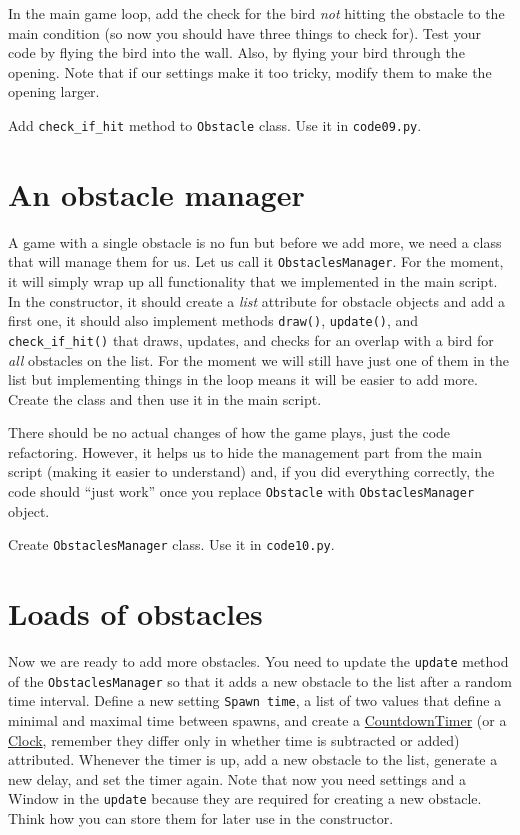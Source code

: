 \documentclass[
]{book}
\begin{document}
In the main game loop, add the check for the bird \emph{not} hitting the obstacle to the main condition (so now you should have three things to check for).
Test your code by flying the bird into the wall. Also, by flying your bird through the opening. Note that if our settings make it too tricky, modify them to make the opening larger.

Add \texttt{check\_if\_hit} method to \texttt{Obstacle} class.
Use it in \texttt{code09.py}.

\hypertarget{an-obstacle-manager}{%
\section{An obstacle manager}\label{an-obstacle-manager}}

A game with a single obstacle is no fun but before we add more, we need a class that will manage them for us. Let us call it \texttt{ObstaclesManager}. For the moment, it will simply wrap up all functionality that we implemented in the main script. In the constructor, it should create a \emph{list} attribute for obstacle objects and add a first one, it should also implement methods \texttt{draw()}, \texttt{update()}, and \texttt{check\_if\_hit()} that draws, updates, and checks for an overlap with a bird for \emph{all} obstacles on the list. For the moment we will still have just one of them in the list but implementing things in the loop means it will be easier to add more. Create the class and then use it in the main script.

There should be no actual changes of how the game plays, just the code refactoring. However, it helps us to hide the management part from the main script (making it easier to understand) and, if you did everything correctly, the code should ``just work'' once you replace \texttt{Obstacle} with \texttt{ObstaclesManager} object.

Create \texttt{ObstaclesManager} class.
Use it in \texttt{code10.py}.

\hypertarget{loads-of-obstacles}{%
\section{Loads of obstacles}\label{loads-of-obstacles}}

Now we are ready to add more obstacles. You need to update the \texttt{update} method of the \texttt{ObstaclesManager} so that it adds a new obstacle to the list after a random time interval. Define a new setting \texttt{Spawn\ time}, a list of two values that define a minimal and maximal time between spawns, and create a \href{https://psychopy.org/api/clock.html\#psychopy.clock.CountdownTimer}{CountdownTimer} (or a \href{https://psychopy.org/api/clock.html\#psychopy.clock.Clock}{Clock}, remember they differ only in whether time is subtracted or added) attributed. Whenever the timer is up, add a new obstacle to the list, generate a new delay, and set the timer again. Note that now you need settings and a Window in the \texttt{update} because they are required for creating a new obstacle. Think how you can store them for later use in the constructor.
\end{document}
